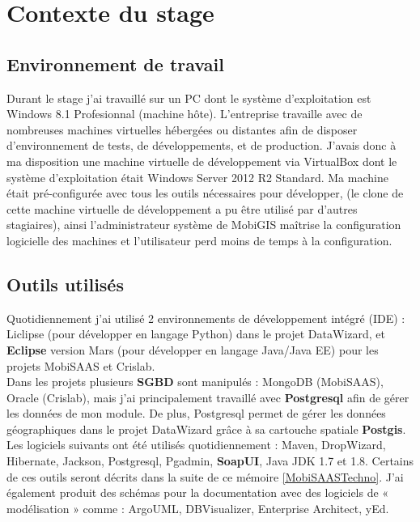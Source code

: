 \chapter{Contexte du stage}
\label{AnalyseConception}

\section{Environnement de travail}

Durant le stage j'ai travaillé sur un PC dont le système d'exploitation est Windows 8.1 Profesionnal (machine hôte). L'entreprise travaille avec de nombreuses machines virtuelles hébergées ou distantes afin de disposer d'environnement de tests, de développements, et de production. J'avais donc à ma disposition une machine virtuelle de développement via VirtualBox dont le système d'exploitation était Windows Server 2012 R2 Standard. 
Ma machine était pré-configurée avec tous les outils nécessaires pour développer, (le clone de cette machine virtuelle de développement a pu être utilisé par d'autres stagiaires), ainsi l'administrateur système de MobiGIS maîtrise la configuration logicielle des machines et l'utilisateur perd moins de temps à la configuration.\\

\section{Outils utilisés}

Quotidiennement j'ai utilisé 2 environnements de développement intégré (IDE) : Liclipse (pour développer en langage Python) dans le projet DataWizard, et \textbf{Eclipse} version Mars (pour développer en langage Java/Java EE) pour les projets MobiSAAS et Crislab.\\

Dans les projets plusieurs \textbf{SGBD} sont manipulés : MongoDB (MobiSAAS), Oracle (Crislab), mais j'ai principalement travaillé avec \textbf{Postgresql} afin de gérer les données de mon module. De plus, Postgresql permet de gérer les données géographiques dans le projet \og DataWizard \fg grâce à sa cartouche spatiale \textbf{Postgis}.\\

Les logiciels suivants ont été utilisés quotidiennement : Maven, DropWizard, Hibernate, Jackson, Postgresql, Pgadmin, \textbf{SoapUI}, Java JDK 1.7 et 1.8. Certains de ces outils seront décrits dans la suite de ce mémoire \ref{MobiSAASTechno}.
J'ai également produit des schémas pour la documentation avec des logiciels de « modélisation » comme : ArgoUML, DBVisualizer, Enterprise Architect, yEd.\\

